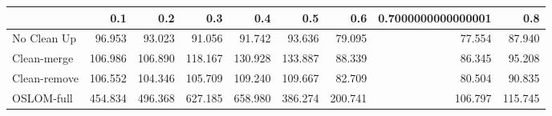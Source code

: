 \begin{tabular}{lrrrrrrrr}
\toprule
{} &     0.1 &     0.2 &     0.3 &     0.4 &     0.5 &     0.6 & 0.7000000000000001 &     0.8 \\
\midrule
No Clean Up  &  96.953 &  93.023 &  91.056 &  91.742 &  93.636 &  79.095 &             77.554 &  87.940 \\
Clean-merge  & 106.986 & 106.890 & 118.167 & 130.928 & 133.887 &  88.339 &             86.345 &  95.208 \\
Clean-remove & 106.552 & 104.346 & 105.709 & 109.240 & 109.667 &  82.709 &             80.504 &  90.835 \\
OSLOM-full   & 454.834 & 496.368 & 627.185 & 658.980 & 386.274 & 200.741 &            106.797 & 115.745 \\
\bottomrule
\end{tabular}
